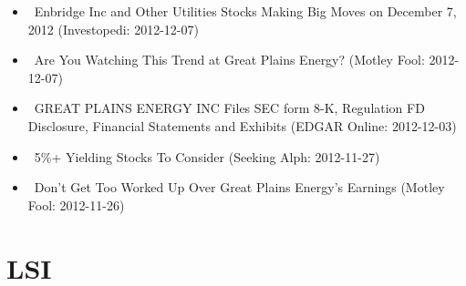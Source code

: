 \documentclass[11pt,asymmetric]{article}
\begin{document}
\begin{itemize}
\item\ Enbridge Inc and Other Utilities Stocks Making Big Moves on December 7, 2012 (Investopedi: 2012-12-07)
\item\ Are You Watching This Trend at Great Plains Energy? (Motley Fool: 2012-12-07)
\item\ GREAT PLAINS ENERGY INC Files SEC form 8-K, Regulation FD Disclosure, Financial Statements and Exhibits (EDGAR Online: 2012-12-03)
\item\ 5\%+ Yielding Stocks To Consider (Seeking Alph: 2012-11-27)
\item\ Don't Get Too Worked Up Over Great Plains Energy's Earnings (Motley Fool: 2012-11-26)
\end{itemize}

\section*{LSI}
\end{document}
